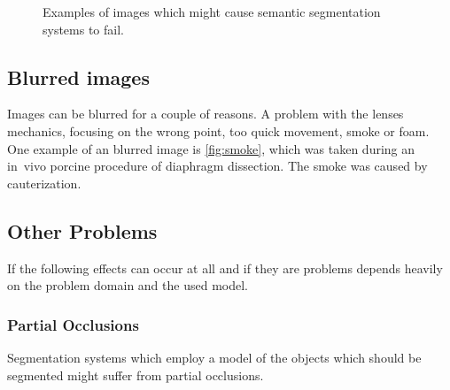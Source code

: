 \begin{figure}
{}
%
\caption{Examples of images which might cause semantic segmentation systems to fail.}
\label{fig:test}
\end{figure}


\subsection{Blurred images}
Images can be blurred for a couple of reasons. A problem with the lenses
mechanics, focusing on the wrong point, too quick movement, smoke or foam.
One example of an blurred image is \cref{fig:smoke}, which was taken during an
in~vivo porcine procedure of diaphragm dissection. The smoke was caused by
cauterization.


\subsection{Other Problems}
If the following effects can occur at all and if they are problems depends
heavily on the problem domain and the used model.

\subsubsection{Partial Occlusions}
Segmentation systems which employ a model of the objects which should be
segmented might suffer from partial occlusions.

